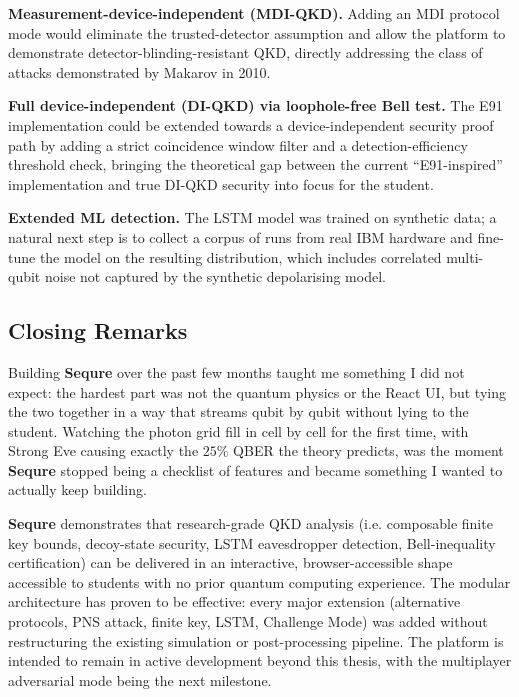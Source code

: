 \documentclass[12pt, a4paper]{article}
\begin{document}
\textbf{Measurement-device-independent (MDI-QKD).} Adding an MDI
protocol mode would eliminate the trusted-detector assumption and allow
the platform to demonstrate detector-blinding-resistant QKD, directly
addressing the class of attacks demonstrated by Makarov in 2010.

\textbf{Full device-independent (DI-QKD) via loophole-free Bell test.}
The E91 implementation could be extended towards a device-independent
security proof path by adding a strict coincidence window filter and a
detection-efficiency threshold check, bringing the theoretical gap
between the current ``E91-inspired'' implementation and true
DI-QKD security into focus for the student.

\textbf{Extended ML detection.} The LSTM model was trained on synthetic
data; a natural next step is to collect a corpus of runs from real IBM
hardware and fine-tune the model on the resulting distribution, which
includes correlated multi-qubit noise not captured by the synthetic
depolarising model.

\subsection{Closing Remarks}
\label{sec:closing}

Building \textbf{Sequre} over the past few months taught me something I did not expect:
the hardest part was not the quantum physics or the React UI, but tying
the two together in a way that streams qubit by qubit without lying to the
student. Watching the photon grid fill in cell by cell for the first time,
with Strong Eve causing exactly the $25\%$ QBER the theory predicts, was
the moment \textbf{Sequre} stopped being a checklist of features and became
something I wanted to actually keep building.

\textbf{Sequre} demonstrates that research-grade QKD analysis (i.e. composable finite key bounds, decoy-state security, LSTM eavesdropper detection, Bell-inequality certification) can be delivered in an interactive, browser-accessible shape accessible to students with no prior quantum computing experience. The modular architecture has proven to be effective: every major extension (alternative protocols, PNS attack, finite key, LSTM, Challenge Mode) was added without restructuring the existing simulation or post-processing pipeline. The platform is intended to remain in active development beyond this thesis, with the multiplayer adversarial mode being the next milestone.
\end{document}
